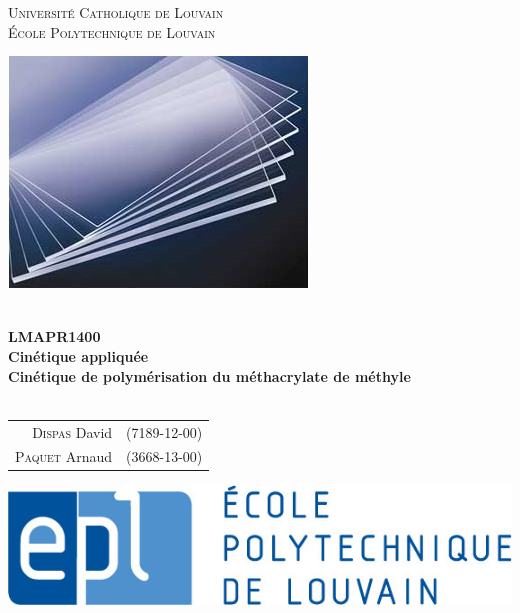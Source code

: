 \documentclass[a4paper,oneside,12pt]{article}
\begin{document}
\begin{titlepage} 
	\centering
	{\LARGE \textsc{Université Catholique de Louvain}}\\
	{\large \textsc{École Polytechnique de Louvain}}\\
	
	\vspace{1.3cm}
	
	\begin{center}
	\includegraphics[scale=0.65]{Images/plexi.jpg}
	\end{center}
	
	\vspace{1.1cm}
	\hrulefill
	\\
	\vspace{0.9cm}
	{\huge \textbf{LMAPR1400}}\\
	\vspace{0.25cm}
	{\huge \textbf{Cinétique appliquée}} \\ 
	\vspace{0.7cm}
	{\huge \textbf{Cinétique de polymérisation du méthacrylate de méthyle}} \\
	\vspace{0.5cm}
	\hrulefill
	\\
	\vspace{0.9cm}
	
	\begin{center}
		\begin{tabular}{rl}
			
			\textsc{Dispas} David & (7189-12-00)\\
			\textsc{Paquet} Arnaud & (3668-13-00)\\
			
		\end{tabular}
	\end{center}
	
	\vfill
	
	\begin{center}
		\includegraphics[scale=0.25]{Images/epl-logo.jpg}
	\end{center}
	

\end{titlepage}
\end{document}
